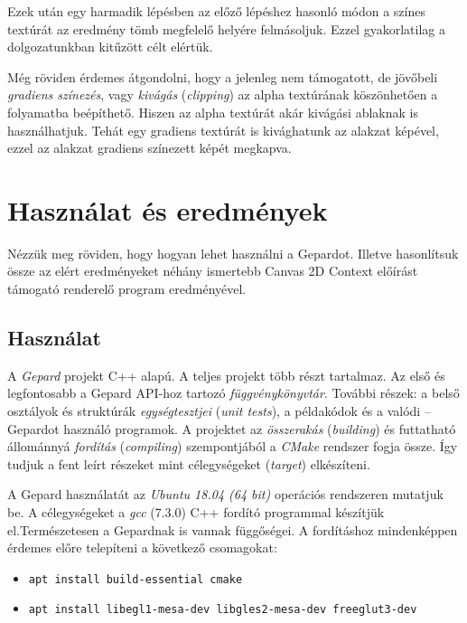 \documentclass[12pt]{report}
\theoremstyle{definition}
\newcommand{\inenglish}[1]{\textsl{#1}}
\newcommand{\func}[1]{{\textsl{#1}}}
\begin{document}
Ezek után egy harmadik lépésben az előző lépéshez hasonló módon a színes
textúrát az eredmény tömb megfelelő helyére felmásoljuk. Ezzel gyakorlatilag a
dolgozatunkban kitűzött célt elértük.

Még röviden érdemes átgondolni, hogy a jelenleg nem támogatott, de jövőbeli
\emph{gradiens színezés}, vagy \emph{kivágás} (\inenglish{clipping}) az alpha
textúrának köszönhetően a folyamatba beépíthető. Hiszen az alpha textúrát akár
kivágási ablaknak is használhatjuk. Tehát egy gradiens textúrát is kivághatunk
az alakzat képével, ezzel az alakzat gradiens színezett képét megkapva.



    \chapter{Használat és eredmények}

Nézzük meg röviden, hogy hogyan lehet használni a Gepardot. Illetve
hasonlítsuk össze az elért eredményeket néhány ismertebb Canvas 2D Context
előírást támogató renderelő program eredményével.

    \section{Használat}

A \emph{Gepard} projekt C++ alapú. A teljes projekt több részt tartalmaz. Az
első és legfontosabb a Gepard API-hoz tartozó \emph{függvénykönyvtár}. További
részek: a belső osztályok és struktúrák \emph{egységtesztjei} (\inenglish{unit
tests}), a példakódok és a valódi -- Gepardot használó programok. A projektet
az \emph{összerakás} (\inenglish{building}) és futtatható állománnyá
\emph{fordítás} (\inenglish{compiling}) szempontjából a \func{CMake} rendszer
fogja össze. Így tudjuk a fent leírt részeket mint célegységeket
(\inenglish{target}) elkészíteni.

A Gepard használatát az \emph{Ubuntu 18.04 (64 bit)} operációs rendszeren
mutatjuk be. A célegységeket a \emph{gcc} (7.3.0) C++ fordító programmal
készítjük el.Természetesen a Gepardnak is vannak függőségei. A fordításhoz
mindenképpen érdemes előre telepíteni a következő csomagokat:
  {\small
    \begin{itemize} \renewcommand\labelitemi{\texttt{\$}}
      \item \texttt{apt install build-essential cmake}
      \item\texttt{apt install libegl1-mesa-dev libgles2-mesa-dev freeglut3-dev}
    \end{itemize}
  }
\end{document}

